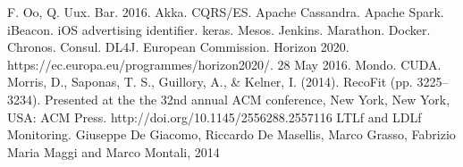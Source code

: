\documentclass[a4paper, 10 pt, conference]{IEEEtran}
\begin{document}
\addtolength{\textheight}{-12cm}  %

\begin{thebibliography}{99}

 F. Oo, Q. Uux. Bar. 2016.
 Akka.
 CQRS/ES.
 Apache Cassandra.
 Apache Spark.
 iBeacon.
 iOS advertising identifier.
 keras.
 Mesos.
 Jenkins.
 Marathon.
 Docker.
 Chronos.
 Consul.
 DL4J.
 European Commission. Horizon 2020. https://ec.europa.eu/programmes/horizon2020/. 28 May 2016.
 Mondo.
 CUDA.
 Morris, D., Saponas, T. S., Guillory, A., \& Kelner, I. (2014). RecoFit (pp. 3225--3234). Presented at the the 32nd annual ACM conference, New York, New York, USA: ACM Press. http://doi.org/10.1145/2556288.2557116
 LTLf and LDLf Monitoring. Giuseppe De Giacomo, Riccardo De Masellis, Marco Grasso, Fabrizio Maria Maggi and Marco Montali, 2014

\end{thebibliography}
\end{document}
